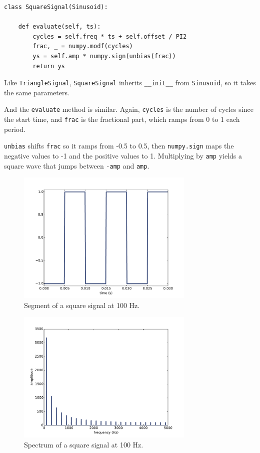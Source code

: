 \documentclass[12pt]{book}
\begin{document}
\begin{verbatim}
class SquareSignal(Sinusoid):
    
    def evaluate(self, ts):
        cycles = self.freq * ts + self.offset / PI2
        frac, _ = numpy.modf(cycles)
        ys = self.amp * numpy.sign(unbias(frac))
        return ys
\end{verbatim}

Like {\tt TriangleSignal}, {\tt SquareSignal} inherits 
\verb"__init__" from {\tt Sinusoid}, so it takes the same
parameters.

And the {\tt evaluate} method is similar.  Again, {\tt cycles} is
the number of cycles since the start time, and {\tt frac} is the
fractional part, which ramps from 0 to 1 each period.

{\tt unbias} shifts {\tt frac} so it ramps from -0.5 to 0.5,
then {\tt numpy.sign} maps the negative values to -1 and the
positive values to 1.  Multiplying by {\tt amp} yields a square
wave that jumps between {\tt -amp} and {\tt amp}.

\begin{figure}
\centerline{\includegraphics[height=2.5in]{figs/square-100-1.pdf}}
\caption{Segment of a square signal at 100 Hz.}
\label{fig.square.100.1}
\end{figure}

\begin{figure}
\centerline{\includegraphics[height=2.5in]{figs/square-100-2.pdf}}
\caption{Spectrum of a square signal at 100 Hz.}
\label{fig.square.100.2}
\end{figure}
\end{document}
